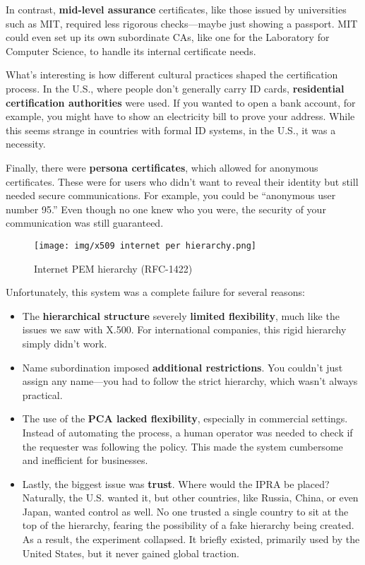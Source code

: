 In contrast, \textbf{mid-level assurance} certificates, like those
issued by universities such as MIT, required less rigorous
checks—maybe just showing a passport. MIT could even set up its own
subordinate CAs, like one for the Laboratory for Computer Science, to
handle its internal certificate needs.

What’s interesting is how different cultural practices shaped the
certification process. In the U.S., where people don’t generally carry
ID cards, \textbf{residential certification authorities} were used. If
you wanted to open a bank account, for example, you might have to show
an electricity bill to prove your address. While this seems strange in
countries with formal ID systems, in the U.S., it was a necessity.

Finally, there were \textbf{persona certificates}, which allowed for
anonymous certificates. These were for users who didn’t want to reveal
their identity but still needed secure communications. For example,
you could be “anonymous user number 95.” Even though no one knew who
you were, the security of your communication was still guaranteed.

\begin{figure}[h]
  \centering
  \texttt{[image: img/x509 internet per
  hierarchy.png]}

  \caption{Internet PEM hierarchy (RFC-1422)}
\end{figure}

Unfortunately, this system was a complete failure for several reasons:

\begin{itemize}
  \item The \textbf{hierarchical structure} severely \textbf{limited
    flexibility}, much like the issues we saw with X.500. For
    international companies, this rigid hierarchy simply didn't work.

  \item Name subordination imposed \textbf{additional restrictions}.
    You couldn't just assign any name—you had to follow the strict
    hierarchy, which wasn't always practical.

  \item The use of the \textbf{PCA lacked flexibility}, especially in
    commercial settings. Instead of automating the process, a human
    operator was needed to check if the requester was following the
    policy. This made the system cumbersome and inefficient for
    businesses.

  \item Lastly, the biggest issue was \textbf{trust}. Where would the
    IPRA be placed? Naturally, the U.S. wanted it, but other
    countries, like Russia, China, or even Japan, wanted control as
    well. No one trusted a single country to sit at the top of the
    hierarchy, fearing the possibility of a fake hierarchy being
    created. As a result, the experiment collapsed. It briefly
    existed, primarily used by the United States, but it never gained
    global traction.
\end{itemize}

